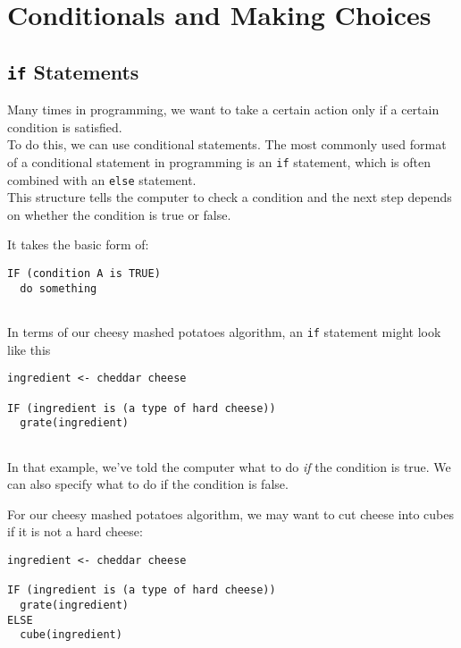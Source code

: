 \documentclass[
]{book}
\begin{document}
\chapter{Conditionals and Making Choices}\label{conditionals-and-making-choices}

\section{\texorpdfstring{\texttt{if} Statements}{if Statements}}\label{if-statements}

Many times in programming, we want to take a certain action only if a certain condition is satisfied.\\

To do this, we can use conditional statements. The most commonly used format of a conditional statement in programming is an \texttt{if} statement, which is often combined with an \texttt{else} statement.\\

This structure tells the computer to check a condition and the next step depends on whether the condition is true or false.

It takes the basic form of:

\begin{verbatim}
IF (condition A is TRUE)
  do something
  
\end{verbatim}

In terms of our cheesy mashed potatoes algorithm, an \texttt{if} statement might look like this

\begin{verbatim}
ingredient <- cheddar cheese

IF (ingredient is (a type of hard cheese))
  grate(ingredient)
  
\end{verbatim}

In that example, we've told the computer what to do \emph{if} the condition is true. We can also specify what to do if the condition is false.

For our cheesy mashed potatoes algorithm, we may want to cut cheese into cubes if it is not a hard cheese:

\begin{verbatim}
ingredient <- cheddar cheese

IF (ingredient is (a type of hard cheese))
  grate(ingredient)
ELSE
  cube(ingredient)
  
\end{verbatim}
\end{document}
